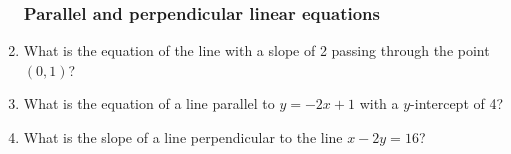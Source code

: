 \documentclass[12pt, oneside]{article}
\begin{document}
\begin{enumerate}
\newpage
\subsubsection*{Parallel and perpendicular linear equations}

  \item What is the equation of the line with a slope of 2 passing through the point $(0,1)$? \vspace{4cm}
  \item What is the equation of a line parallel to $y=-2x+1$ with a $y$-intercept of 4? \vspace{4cm}
  \item What is the slope of a line perpendicular to the line $x-2y=16$? \vspace{4cm}

\end{enumerate}
\end{document}
